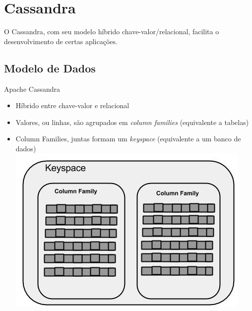 \section{Cassandra}
O Cassandra, com seu modelo híbrido chave-valor/relacional, facilita o desenvolvimento de certas aplicações.

\subsection{Modelo de Dados}
\begin{frame}{Apache Cassandra}
\begin{itemize}
\item Híbrido entre chave-valor e relacional
\item Valores, ou linhas, são agrupados em \emph{column families} (equivalente a tabelas)
\item Column Families, juntas formam um \emph{keyspace} (equivalente a um banco de dados)
\includegraphics[width=.7\textwidth]{images/cass_keyspace}
\end{itemize}
\end{frame}


